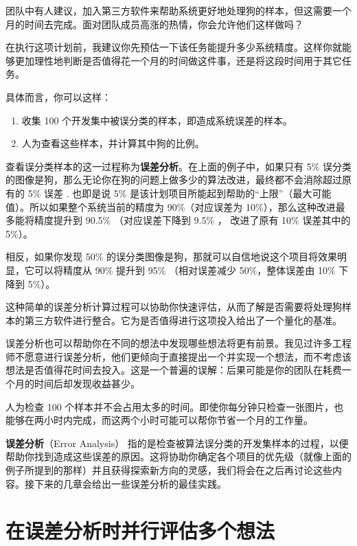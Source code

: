 团队中有人建议，加入第三方软件来帮助系统更好地处理狗的样本，但这需要一个月的时间去完成。面对团队成员高涨的热情，你会允许他们这样做吗？

在执行这项计划前，我建议你先预估一下该任务能提升多少系统精度。这样你就能够更加理性地判断是否值得花一个月的时间做这件事，还是将这段时间用于其它任务。

具体而言，你可以这样：

\begin{enumerate}
\def\labelenumi{\arabic{enumi}.}
\tightlist
\item
  收集 100 个开发集中被误分类的样本，即造成系统误差的样本。
\item
  人为查看这些样本，并计算其中狗的比例。
\end{enumerate}

查看误分类样本的这一过程称为\textbf{误差分析}。在上面的例子中，如果只有
5\%
误分类的图像是狗，那么无论你在狗的问题上做多少的算法改进，最终都不会消除超过原有的
5\% 误差 . 也即是说 5\%
是该计划项目所能起到帮助的``上限''（最大可能值）。所以如果整个系统当前的精度为
90\%（对应误差为 10\%），那么这种改进最多能将精度提升到 90.5\%
（对应误差下降到 9.5\% ， 改进了原有 10\% 误差其中的 5\%）。

相反，如果你发现 50\%
的误分类图像是狗，那就可以自信地说这个项目将效果明显，它可以将精度从
90\% 提升到 95\% （相对误差减少 50\%，整体误差由 10\% 下降到 5\%）。

这种简单的误差分析计算过程可以协助你快速评估，从而了解是否需要将处理狗样本的第三方软件进行整合。它为是否值得进行这项投入给出了一个量化的基准。

误差分析也可以帮助你在不同的想法中发现哪些想法将更有前景。我见过许多工程师不愿意进行误差分析，他们更倾向于直接提出一个并实现一个想法，而不考虑该想法是否值得花时间去投入。这是一个普遍的误解：后果可能是你的团队在耗费一个月的时间后却发现收益甚少。

人为检查 100
个样本并不会占用太多的时间。即使你每分钟只检查一张图片，也能够在两小时内完成，而这两个小时可能可以帮你节省一个月的工作量。

\textbf{误差分析}（Error Analysis）
指的是检查被算法误分类的开发集样本的过程，以便帮助你找到造成这些误差的原因。这将协助你确定各个项目的优先级（就像上面的例子所提到的那样）并且获得探索新方向的灵感，我们将会在之后再讨论这些内容。接下来的几章会给出一些误差分析的最佳实践。

\hypertarget{ux5728ux8befux5deeux5206ux6790ux65f6ux5e76ux884cux8bc4ux4f30ux591aux4e2aux60f3ux6cd5}{%
\chapter{在误差分析时并行评估多个想法}\label{ux5728ux8befux5deeux5206ux6790ux65f6ux5e76ux884cux8bc4ux4f30ux591aux4e2aux60f3ux6cd5}}

